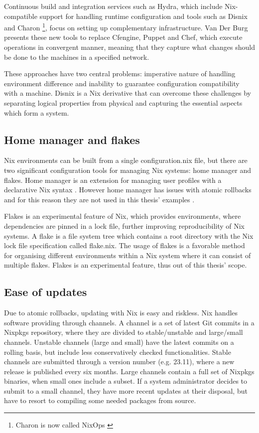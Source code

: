 Continuous build and integration services such as Hydra,
which include Nix-compatible support for handling runtime
configuration and tools such as Disnix and Charon \footnote{Charon is
now called NixOps \cite{githubNixNixpkgsNixOS}}, focus on
setting up complementary infrastructure. Van Der Burg presents these
new tools to replace Cfengine, Puppet and Chef, which execute
operations in convergent manner, meaning that they capture what
changes should be done to the machines in a specified
network. \cite{van2013reference}

These approaches have two central problems: imperative nature of
handling environment difference and inability to guarantee
configuration compatibility with a machine. Disnix is a Nix derivative
that can overcome these challenges by separating logical properties
from physical and capturing the essential aspects which form a
system. \cite{van2013reference}

\subsection{Home manager and flakes}

Nix environments can be built from a single configuration.nix file,
but there are two significant configuration tools for managing Nix
systems: home manager and flakes. Home manager is an extension for
managing user profiles with a declarative Nix syntax
\cite{nixcommunityHomeManager}. However home manager has issues with atomic
rollbacks and for this reason they are not used in this thesis'
examples \cite{nixcommunityHomeManager}.

Flakes is an experimental feature of Nix, which provides environments, where
dependencies are pinned in a lock file, further improving
reproducibility of Nix systems. A flake is a
file system tree which contains a root directory with the Nix lock file
specification called flake.nix. The usage of flakes is a favorable method
for organising different environments within a Nix system where it
can consist of multiple flakes. Flakes is an experimental
feature, thus out of this thesis' scope. \cite{nixosFlakesNixOS}

\subsection{Ease of updates}

Due to atomic rollbacks, updating with Nix is easy and riskless. Nix handles software providing through  channels. A channel is a set of latest Git commits in a Nixpkgs
repository, where they are divided to stable/unstable and
large/small channels. Unstable channels (large and small) have the
latest commits on a rolling basis, but include less conservatively
checked functionalities. Stable channels are submitted through a
version number (e.g. 23.11), where a new release is published every
six months. Large channels contain a full set of
Nixpkgs binaries, when small ones include a subset. If a system
administrator decides to submit to a small channel, they have more
recent updates at their disposal, but have to resort to compiling some
needed packages from source. \cite{nixosChannelsNixOS}

